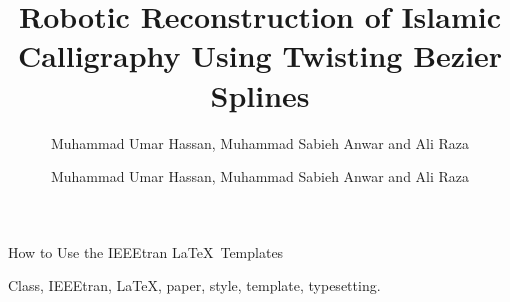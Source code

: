 \documentclass[lettersize,journal]{IEEEtran}
\begin{document}
\title{Robotic Reconstruction of Islamic Calligraphy Using Twisting Bezier Splines}
\author{Muhammad Umar Hassan, Muhammad Sabieh Anwar and Ali Raza
}

%
{How to Use the IEEEtran \LaTeX \ Templates}

\maketitle

\author{Muhammad Umar Hassan, Muhammad Sabieh Anwar and Ali Raza}
%

\begin{IEEEkeywords}
Class, IEEEtran, \LaTeX, paper, style, template, typesetting.
\end{IEEEkeywords}




\end{document}

